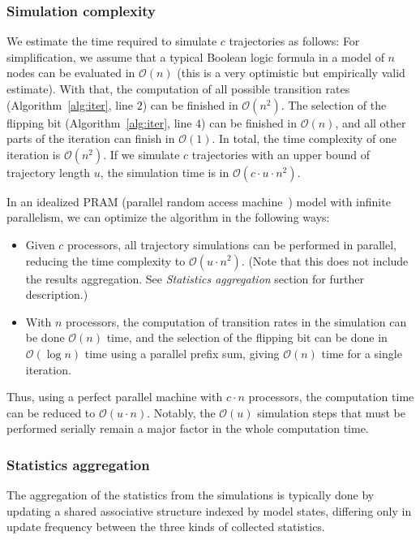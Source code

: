 \documentclass[sn-mathphys-num]{sn-jnl}%
\begin{document}
\subsubsection{Simulation complexity}

We estimate the time required to simulate $c$ trajectories as follows:
For simplification, we assume that a typical Boolean logic formula in a model of $n$ nodes can be evaluated in $\mathcal{O}(n)$ (this is a very optimistic but empirically valid estimate). With that, the computation of all possible transition rates (Algorithm~\ref{alg:iter}, line $2$) can be finished in $\mathcal{O}(n^2)$. The selection of the flipping bit (Algorithm~\ref{alg:iter}, line $4$) can be finished in $\mathcal{O}(n)$, and all other parts of the iteration can finish in $\mathcal{O}(1)$. In total, the time complexity of one iteration is $\mathcal{O}(n^2)$. If we simulate $c$ trajectories with an upper bound of trajectory length $u$, the simulation time is in $\mathcal{O}(c \cdot u \cdot n^2)$.

In an idealized PRAM (parallel random access machine~\cite{fortune1978parallelism}) model with infinite parallelism, we can optimize the algorithm in the following ways:
\begin{itemize}
    \item Given $c$ processors, all trajectory simulations can be performed in parallel, reducing the time complexity to $\mathcal{O}(u \cdot n^2)$. (Note that this does not include the results aggregation. See \emph{Statistics aggregation} section for further description.)
    \item With $n$ processors, the computation of transition rates in the simulation can be done $\mathcal{O}(n)$ time, and the selection of the flipping bit can be done in $\mathcal{O}(\log{n})$ time using a parallel prefix sum, giving $\mathcal{O}(n)$ time for a single iteration.
\end{itemize}
Thus, using a perfect parallel machine with $c \cdot n$ processors, the computation time can be reduced to $\mathcal{O}(u \cdot n)$. Notably, the $\mathcal{O}(u)$ simulation steps that must be performed serially remain a major factor in the whole computation time.

\subsubsection{Statistics aggregation}

The aggregation of the statistics from the simulations is typically done by updating a shared associative structure indexed by model states, differing only in update frequency between the three kinds of collected statistics.
\end{document}
